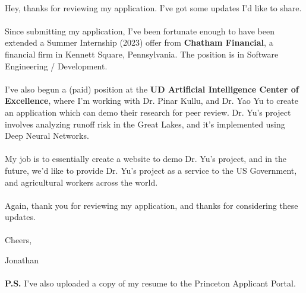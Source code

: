 \documentclass[letterpaper,12pt]{article}
\begin{document}
\paragraph{}Hey, thanks for reviewing my application. I've got some updates I'd like to share.

\paragraph{}Since submitting my application, I've been fortunate enough 
to have been extended a Summer Internship (2023) offer from \textbf{Chatham Financial}, 
a financial firm in Kennett Square, Pennsylvania. The position is in Software Engineering / Development.


\paragraph{}I've also begun a (paid) position at the \textbf{UD Artificial Intelligence Center of Excellence}, where
I'm working with Dr. Pinar Kullu, and Dr. Yao Yu to create an application which can demo
their research for peer review. Dr. Yu's project involves analyzing runoff risk in the Great Lakes,
and it's implemented using Deep Neural Networks. 

\paragraph{}My job is to essentially create a website to demo Dr. Yu's project, and in the future,
we'd like to provide Dr. Yu's project as a service to the US Government, and agricultural workers across
the world. 

\paragraph{}Again, thank you for reviewing my application, and thanks for considering these updates.


\paragraph{}Cheers,



Jonathan

\paragraph{} \textbf{P.S.} I've also uploaded a copy of my resume to the Princeton Applicant Portal.
\end{document}
